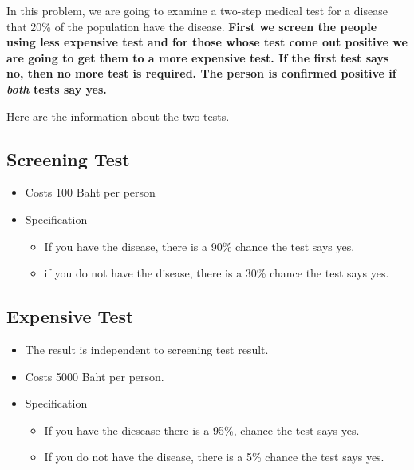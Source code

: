 \documentclass[a4paper, 12pt]{article}
\begin{document}
\begin{enumerate}
	In this problem, we are going to examine a two-step medical test for a disease that 20\% of the population have the disease. \textbf{First we screen the people using less expensive test and for those whose test come out positive we are going to get them to a more expensive test. If the first test says no, then no more test is required. The person is confirmed positive if \emph{both} tests say yes.}
	
	Here are the information about the two tests.
	
	\subsection*{Screening Test}
		\begin{itemize}
			\item Costs 100 Baht per person
			\item Specification
			\begin{itemize}
				\item If you have the disease, there is a 90\% chance the test says yes.
				\item if you do not have the disease, there is a 30\% chance the test says yes.
			\end{itemize}
		\end{itemize}
		
	\subsection*{Expensive Test}
	\begin{itemize}
		\item The result is independent to screening test result.
		\item Costs 5000 Baht per person.
		\item Specification
		\begin{itemize}
			\item If you have the diesease there is a 95\%, chance the test says yes.
			\item If you do not have the disease, there is a 5\% chance the test says yes.
		\end{itemize}
	\end{itemize}
	
	\begin{enumerate}
	

\end{enumerate}
\end{enumerate}
\end{document}
